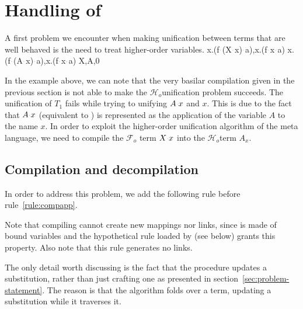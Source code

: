 \documentclass[sigconf,natbib=false,review]{acmart}
\newcommand{\appsep}{\ensuremath{\textcolor{lightgray}{\cdot}}}
\newcommand{\Fo}{\texorpdfstring{\ensuremath{\mathcal{F}_{\!o}\xspace}}{Fo}} %
\newcommand{\Ho}{\texorpdfstring{\ensuremath{\mathcal{H}_o}\xspace}{Ho}}
\begin{document}
  
\section{Handling of \maybebeta}\label{sec:llam}

A first problem we encounter when making unification between terms that are
well behaved is the need to treat higher-order variables. 
%
\printAlll
  {{{\lambda x.(f\appsep (X\appsep x)\appsep a),\lambda x.(f\appsep x\appsep a)}}}
  {{{\lambda x.(f\appsep (A\appsep x)\appsep a),\lambda x.(f\appsep x\appsep a)}}}
  {{{X,A,0}}}
  {{}}

In the example above, we can note that the very basilar compilation given in 
the previous section is not able to make the \Ho unification problem succeeds.
The unification of $T_1$ fails while trying to unifying $A \appsep x$ and $x$.
This is due to the fact that $A \appsep x$ (equivalent to )
is represented as the application of the variable $A$ to the name $x$.
In order to exploit the higher-order unification algorithm of the meta language,
we need to compile the \Fo{} term $X\appsep x$ into the \Ho term $A_x$.

\subsection{Compilation and decompilation}

In order to address this problem, we add the following rule before rule~\ref{rule:compapp}.



\noindent
Note that compiling  cannot create new mappings nor links, since 
is made of bound variables and the hypothetical rule loaded by 
(see below) grants this property. Also note that this rule generates no links.


\noindent
The only detail worth discussing is the fact that the procedure updates a
substitution, rather than just crafting one as presented in
section~\ref{sec:problem-statement}. The reason is that the algorithm folds
over a term, updating a substitution while it traverses it.
\end{document}
